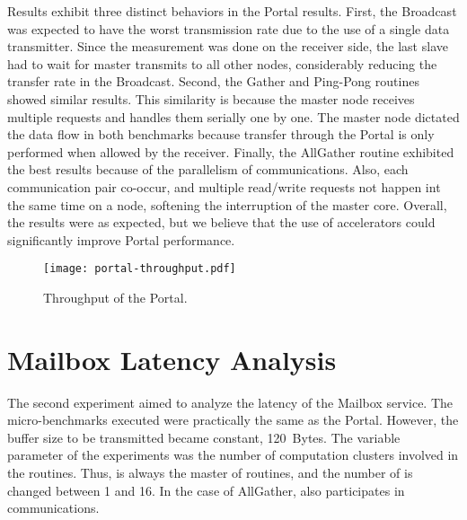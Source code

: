 		Results exhibit three distinct behaviors in the Portal results. First,
		the Broadcast was expected to have the worst transmission rate due to
		the use of a single data transmitter. Since the measurement was done
		on the receiver side, the last slave had to wait for master transmits
		to all other nodes, considerably reducing the transfer rate in the
		Broadcast. Second, the Gather and Ping-Pong routines showed similar
		results. This similarity is because the master node receives multiple
		requests and handles them serially one by one. The master node
		dictated the data flow in both benchmarks because transfer through
		the Portal is only performed when allowed by the receiver. Finally,
		the AllGather routine exhibited the best results because of the
		parallelism of communications. Also, each communication pair co-occur,
		and multiple read/write requests not happen int the same time on a node,
		softening the interruption of the master core. Overall, the results
		were as expected, but we believe that the use of \dma accelerators could
		significantly improve Portal performance.

		\begin{figure}[!tb]
			\centering%
			\caption{Throughput of the Portal.}%
			\label{fig:exp-portal}%
			\texttt{[image: portal-throughput.pdf]}%
		\end{figure}

	\section{Mailbox Latency Analysis}

		The second experiment aimed to analyze the latency of the Mailbox
		service. The micro-benchmarks executed were practically the same
		as the Portal. However, the buffer size to be transmitted became
		constant, 120~Bytes. The variable parameter of the experiments was
		the number of computation clusters involved in the routines.
		Thus, \iocluster is always the master of routines, and the number
		of \ccluster is changed between 1 and 16. In the case of AllGather,
		\iocluster also participates in communications.

